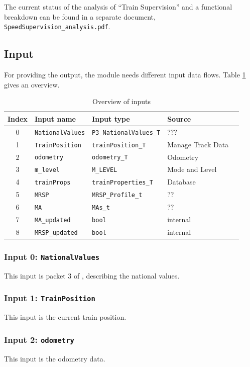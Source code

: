The current status of the analysis of ``Train Supervision'' and a functional breakdown can be found in a separate document, \verb+SpeedSupervision_analysis.pdf+.



\subsection{Input}
For providing the output, the module needs different input data flows. Table \ref{tbl:speedsupervisionInput} gives an overview.

\begin{table}[H]
  \begin{tabular}{| c | l | l | l | l |}
    \hline
    \textbf{Index} & \textbf{Input name} & \textbf{Input type} & \textbf{Source}\\ \hline
    0 & \texttt{NationalValues} & \texttt{P3\_NationalValues\_T} & ???\\
    1 & \texttt{TrainPosition} & \texttt{trainPosition\_T} & Manage Track Data\\
    2 & \texttt{odometry} & \texttt{odometry\_T} & Odometry\\
    3 & \texttt{m\_level} & \texttt{M\_LEVEL} & Mode and Level\\
    4 & \texttt{trainProps} & \texttt{trainProperties\_T} & Database\\
    5 & \texttt{MRSP} & \texttt{MRSP\_Profile\_t} & ?? \\
    6 & \texttt{MA} & \texttt{MAs\_t} & ??\\
    7 & \texttt{MA\_updated} & \texttt{bool} & internal\\
    8 & \texttt{MRSP\_updated} & \texttt{bool} & internal\\
    \hline
  \end{tabular} 
  \caption{Overview of inputs}
  \label{tbl:speedsupervisionInput}
\end{table}

\subsubsection{Input 0: \texttt{NationalValues}}
This input is packet 3 of \cite[Chapt.~8]{subset-026}, describing the national values. 
\subsubsection{Input 1: \texttt{TrainPosition}}
This input is the current train position.
\subsubsection{Input 2: \texttt{odometry}}
This input is the odometry data.
